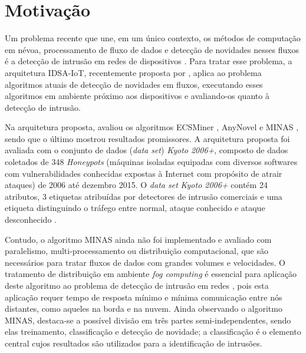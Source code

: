 \section{Motivação}\label{sec:motivo}

\newcommand{\idsiot}{IDSA-IoT\xspace}
\newcommand{\fog}{\emph{fog computing}\xspace}

Um problema recente que une, em um único contexto, os métodos de computação em
névoa, processamento de fluxo de dados e detecção de novidades nesses fluxos é a
detecção de intrusão em redes de dispositivos \iot.
Para tratar esse problema, a arquitetura \idsiot, recentemente proposta por
, aplica ao problema algoritmos atuais de detecção de
novidades em fluxos, executando esses algoritmos em ambiente próximo aos
dispositivos e avaliando-os quanto à detecção de intrusão.

Na arquitetura proposta,  avaliou os algoritmos
ECSMiner \cite{Masud2010ECSMiner}, AnyNovel \cite{Abdallah2016anynovel} e MINAS
\cite{Faria2015minas}, sendo que o último mostrou resultados promissores.
A arquitetura proposta foi avaliada com o conjunto de dados (\emph{data set})
\emph{Kyoto 2006+}, composto de dados coletados de 348 \emph{Honeypots}
(máquinas isoladas equipadas com diversos softwares com vulnerabilidades
conhecidas expostas à Internet com propósito de atrair ataques) de 2006 até
dezembro 2015.
O \emph{data set} \emph{Kyoto 2006+} contém 24 atributos, 3 etiquetas atribuídas por
detectores de intrusão comerciais e uma etiqueta
distinguindo o tráfego entre normal, ataque conhecido e ataque desconhecido
\cite{Cassales2019a}.

Contudo, o algoritmo MINAS ainda não foi implementado e avaliado com paralelismo,
multi-processamento ou distribuição computacional, que são necessários para
tratar fluxos de dados com grandes volumes e velocidades.
O tratamento de distribuição em ambiente \fog é essencial para aplicação deste
algoritmo ao problema de detecção de intrusão em redes \iot, pois esta aplicação
requer tempo de resposta mínimo e mínima comunicação entre nós distantes, como
aqueles na borda e na nuvem.
Ainda observando o algoritmo MINAS, destaca-se a possível divisão em três partes
semi-independentes, sendo elas treinamento, classificação e detecção de
novidade; a classificação é o elemento central cujos resultados são utilizados
para a identificação de intrusões.

